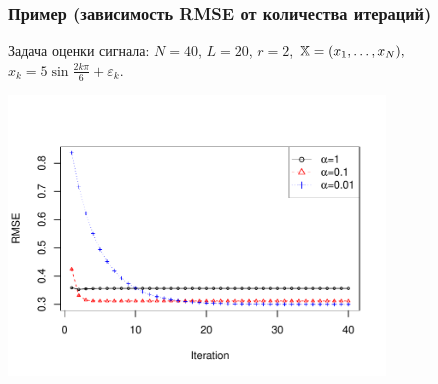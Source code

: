 \documentclass[unicode, notheorems]{beamer}
\begin{document}
\begin{frame}
	\frametitle{Пример (зависимость RMSE от количества итераций)}
	Задача оценки сигнала: $N = 40$, $L = 20$, $r = 2$, $\mathbb{X} = (x_{1}, \ldots, x_N),$  $x_k = 5\sin{\frac{2 k \pi}{6}} + \varepsilon_k$.
	
	\vspace{-1cm}
	\begin{center}
		\includegraphics*[width = 10cm]{cadzowspeed_3.pdf}
	\end{center}
\end{frame}

%	

	
\end{document}
